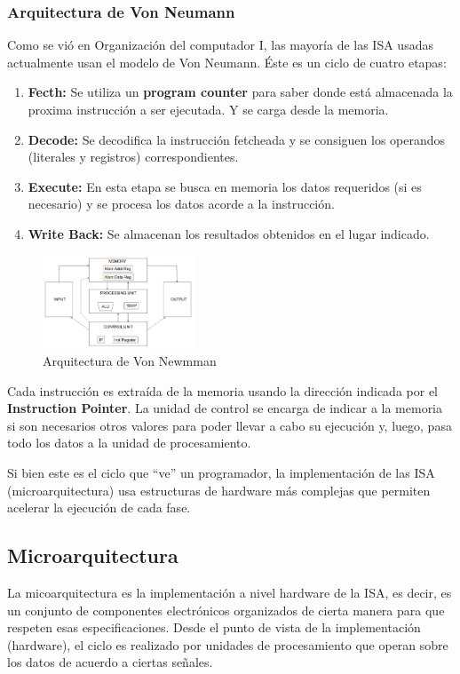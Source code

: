 \subsubsection{Arquitectura de Von Neumann}\label{sec::Intro::ISA::Von_Neuman}
Como se vió en Organización del computador I, las mayoría de las ISA usadas actualmente usan el modelo de Von Neumann. Éste es un ciclo de cuatro etapas: 

\begin{enumerate}
	\item \textbf{Fecth:} Se utiliza un \textbf{program counter} para saber donde está almacenada la proxima instrucción a ser ejecutada. Y se carga desde la memoria.
	\item \textbf{Decode:} Se decodifica la instrucción fetcheada y se consiguen los operandos (literales y registros) correspondientes.
	\item \textbf{Execute:} En esta etapa se busca en memoria los datos requeridos (si es necesario) y se procesa los datos acorde a la instrucción.
	\item \textbf{Write Back:} Se almacenan los resultados obtenidos en el lugar indicado.
\end{enumerate}

\begin{figure}[ht]
	\centering
	\includegraphics[width=0.4\textwidth]{imagenes/von-neuman-arquichtecture}
	\caption{Arquitectura de Von Newmman}
	\label{fig:intro:componentesIsa::vonsneumanarquichtecture}
\end{figure}
Cada instrucción es extraída de la memoria usando la dirección indicada por el \textbf{Instruction Pointer}. La unidad de control se encarga de indicar a la memoria si son necesarios otros valores para poder llevar a cabo su ejecución y, luego, pasa todo los datos a la unidad de procesamiento.

Si bien este es el ciclo que ``ve'' un programador, la implementación de las ISA (microarquitectura) usa estructuras de hardware más complejas que permiten acelerar la ejecución de cada fase.

\subsection{Microarquitectura}
La micoarquitectura es la implementación a nivel hardware de la ISA, es decir, es un conjunto de componentes electrónicos organizados de cierta manera para que respeten esas especificaciones.  Desde el punto de vista de la implementación (hardware), el ciclo es realizado por unidades de procesamiento que operan sobre los datos de acuerdo a ciertas señales. 

